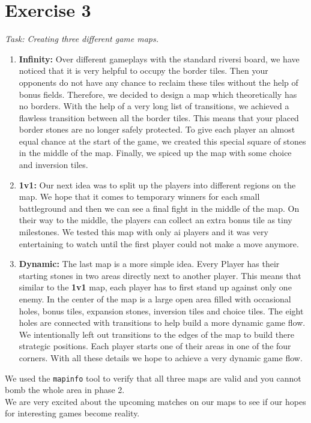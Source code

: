 \section{Exercise 3}
\textit{Task: Creating three different game maps.} 

\begin{enumerate}
    \item \textbf{Infinity:} Over different gameplays with the standard riversi board, we have noticed that it is very helpful to occupy the border tiles. Then your opponents do not have any chance to reclaim these tiles without the help of bonus fields. Therefore, we decided to design a map which theoretically has no borders. With the help of a very long list of transitions, we achieved a flawless transition between all the border tiles. This means that your placed border stones are no longer safely protected. To give each player an almost equal chance at the start of the game, we created this special square of stones in the middle of the map. Finally, we spiced up the map with some choice and inversion tiles.
    
    \item \textbf{1v1:} Our next idea was to split up the players into different regions on the map. We hope that it comes to temporary winners for each small battleground and then we can see a final fight in the middle of the map. On their way to the middle, the players can collect an extra bonus tile as tiny milestones. We tested this map with only ai players and it was very entertaining to watch until the first player could not make a move anymore.
    
    \item \textbf{Dynamic: } The last map is a more simple idea. Every Player has their starting stones in two areas directly next to another player. This means that similar to the \textbf{1v1} map, each player has to first stand up against only one enemy. In the center of the map is a large open area filled with occasional holes, bonus tiles, expansion stones, inversion tiles and choice tiles. The eight holes are connected with transitions to help build a more dynamic game flow. We intentionally left out transitions to the edges of the map to build there strategic positions. Each player starts one of their areas in one of the four corners. With all these details we hope to achieve a very dynamic game flow.
\end{enumerate}

\noindent We used the \texttt{mapinfo} tool to verify that all three maps are valid and you cannot bomb the whole area in phase 2.\\
\noindent We are very excited about the upcoming matches on our maps to see if our hopes for interesting games become reality.
